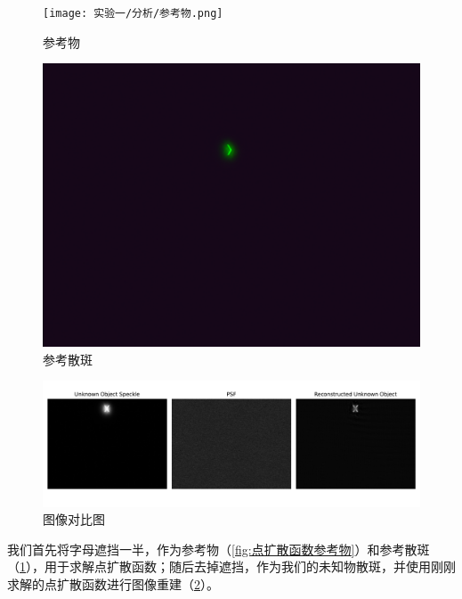   \begin{figure}[H]
    \begin{minipage}[b]{0.48\linewidth}
      \centering
      \texttt{[image: 实验一/分析/参考物.png]}
      \caption{参考物}
      \label{fig:点扩散函数参考物}
    \end{minipage}
    \hfill
    \begin{minipage}[b]{0.48\linewidth}
      \centering
      \includegraphics[width=\linewidth]{images/实验一/分析/参考散斑}
      \caption{参考散斑}
      \label{fig:点扩散函数参考散斑}
    \end{minipage}
  \end{figure}
  \begin{figure}[{H}]
    \centering
    \includegraphics[width=0.8\linewidth]{images/实验一/分析/图像对比图.pdf}
    \caption{图像对比图}
    \label{fig:点扩散函数图像重建}
  \end{figure}




  我们首先将字母遮挡一半，作为参考物（\cref{fig:点扩散函数参考物}）和参考散斑（\cref{fig:点扩散函数参考散斑}），用于求解点扩散函数；随后去掉遮挡，作为我们的未知物散斑，并使用刚刚求解的点扩散函数进行图像重建（\cref{fig:点扩散函数图像重建}）。


